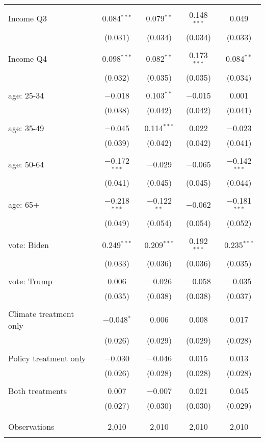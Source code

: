 \begin{tabular}{@{\extracolsep{5pt}}lcccc}
  & & & & \\ 
 Income Q3 & 0.084$^{***}$ & 0.079$^{**}$ & 0.148$^{***}$ & 0.049 \\ 
  & (0.031) & (0.034) & (0.034) & (0.033) \\ 
  & & & & \\ 
 Income Q4 & 0.098$^{***}$ & 0.082$^{**}$ & 0.173$^{***}$ & 0.084$^{**}$ \\ 
  & (0.032) & (0.035) & (0.035) & (0.034) \\ 
  & & & & \\ 
 age: 25-34 & $-$0.018 & 0.103$^{**}$ & $-$0.015 & 0.001 \\ 
  & (0.038) & (0.042) & (0.042) & (0.041) \\ 
  & & & & \\ 
 age: 35-49 & $-$0.045 & 0.114$^{***}$ & 0.022 & $-$0.023 \\ 
  & (0.039) & (0.042) & (0.042) & (0.041) \\ 
  & & & & \\ 
 age: 50-64 & $-$0.172$^{***}$ & $-$0.029 & $-$0.065 & $-$0.142$^{***}$ \\ 
  & (0.041) & (0.045) & (0.045) & (0.044) \\ 
  & & & & \\ 
 age: 65+ & $-$0.218$^{***}$ & $-$0.122$^{**}$ & $-$0.062 & $-$0.181$^{***}$ \\ 
  & (0.049) & (0.054) & (0.054) & (0.052) \\ 
  & & & & \\ 
 vote: Biden & 0.249$^{***}$ & 0.209$^{***}$ & 0.192$^{***}$ & 0.235$^{***}$ \\ 
  & (0.033) & (0.036) & (0.036) & (0.035) \\ 
  & & & & \\ 
 vote: Trump & 0.006 & $-$0.026 & $-$0.058 & $-$0.035 \\ 
  & (0.035) & (0.038) & (0.038) & (0.037) \\ 
  & & & & \\ 
 Climate treatment only & $-$0.048$^{*}$ & 0.006 & 0.008 & 0.017 \\ 
  & (0.026) & (0.029) & (0.029) & (0.028) \\ 
  & & & & \\ 
 Policy treatment only & $-$0.030 & $-$0.046 & 0.015 & 0.013 \\ 
  & (0.026) & (0.028) & (0.028) & (0.028) \\ 
  & & & & \\ 
 Both treatments & 0.007 & $-$0.007 & 0.021 & 0.045 \\ 
  & (0.027) & (0.030) & (0.030) & (0.029) \\ 
  & & & & \\ 
\hline \\[-1.8ex] 

Observations & 2,010 & 2,010 & 2,010 & 2,010 \\ 
\hline 
\hline \\[-1.8ex] 
\end{tabular} 